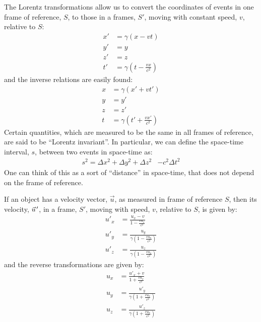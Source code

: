 \begin{chapterSummary}
The Lorentz transformations allow us to convert the coordinates of events in one frame of reference, $S$, to those in a frames, $S'$, moving with constant speed, $v$, relative to $S$:
\begin{align*}
x' &=\gamma (x-vt)\\
y' &= y\\
z' &= z\\
t' &=\gamma\left(t-\frac{vx}{c^2} \right)
\end{align*}
and the inverse relations are easily found:
\begin{align*}
x &=\gamma (x'+vt')\\
y &= y'\\
z &= z'\\
t &=\gamma\left(t'+\frac{vx'}{c^2} \right)
\end{align*}
Certain quantities, which are measured to be the same in all frames of reference, are said to be ``Lorentz invariant''. In particular, we can define the space-time interval, $s$, between two events in space-time as:
\begin{align*}
s^2 = \Delta x^2 + \Delta y^2 +\Delta z^2&-c^2\Delta t^2
\end{align*}
One can think of this as a sort of ``distance'' in space-time, that does not depend on the frame of reference.

If an object has a velocity vector, $\vec u$, as measured in frame of reference $S$, then its velocity, $\pvec u'$, in a frame, $S'$, moving with speed, $v$, relative to $S$, is given by:
\begin{align*}
u'_x&=\frac{u_x -v}{1- \frac{vu_x}{c^2}}\\
u'_y &=\frac{u_y}{\gamma\left(1- \frac{vu_x}{c^2}\right)}\\
u'_z &=\frac{u_z}{\gamma\left(1- \frac{vu_x}{c^2}\right)}
\end{align*}
and the reverse transformations are given by:
\begin{align*}
u_x &=\frac{u'_x +v}{1+ \frac{vu_x}{c^2}}\\
u_y &=\frac{u'_y}{\gamma\left(1+ \frac{vu_x}{c^2}\right)}\\
u_z &=\frac{u'_z}{\gamma\left(1+ \frac{vu_x}{c^2}\right)}
\end{align*}


\end{chapterSummary}
